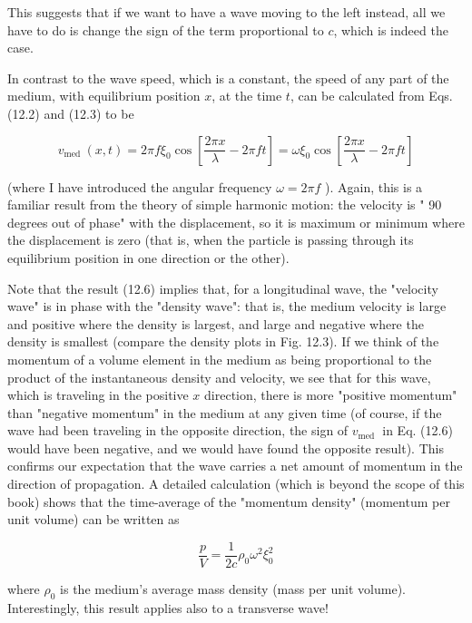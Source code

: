 \documentclass[10pt]{article}
\begin{document}
This suggests that if we want to have a wave moving to the left instead, all we have to do is change the sign of the term proportional to $c$, which is indeed the case.

In contrast to the wave speed, which is a constant, the speed of any part of the medium, with equilibrium position $x$, at the time $t$, can be calculated from Eqs. (12.2) and (12.3) to be


\begin{equation*}
v_{\text {med }}(x, t)=2 \pi f \xi_{0} \cos \left[\frac{2 \pi x}{\lambda}-2 \pi f t\right]=\omega \xi_{0} \cos \left[\frac{2 \pi x}{\lambda}-2 \pi f t\right] \tag{12.6}
\end{equation*}


(where I have introduced the angular frequency $\omega=2 \pi f$ ). Again, this is a familiar result from the theory of simple harmonic motion: the velocity is " 90 degrees out of phase" with the displacement, so it is maximum or minimum where the displacement is zero (that is, when the particle is passing through its equilibrium position in one direction or the other).

Note that the result (12.6) implies that, for a longitudinal wave, the "velocity wave" is in phase with the "density wave": that is, the medium velocity is large and positive where the density is largest, and large and negative where the density is smallest (compare the density plots in Fig. 12.3). If we think of the momentum of a volume element in the medium as being proportional to the product of the instantaneous density and velocity, we see that for this wave, which is traveling in the positive $x$ direction, there is more "positive momentum" than "negative momentum" in the medium at any given time (of course, if the wave had been traveling in the opposite direction, the sign of $v_{\text {med }}$ in Eq. (12.6) would have been negative, and we would have found the opposite result). This confirms our expectation that the wave carries a net amount of momentum in the direction of propagation. A detailed calculation (which is beyond the scope of this book) shows that the time-average of the "momentum density" (momentum per unit volume) can be written as


\begin{equation*}
\frac{p}{V}=\frac{1}{2 c} \rho_{0} \omega^{2} \xi_{0}^{2} \tag{12.7}
\end{equation*}


where $\rho_{0}$ is the medium's average mass density (mass per unit volume). Interestingly, this result applies also to a transverse wave!
\end{document}

